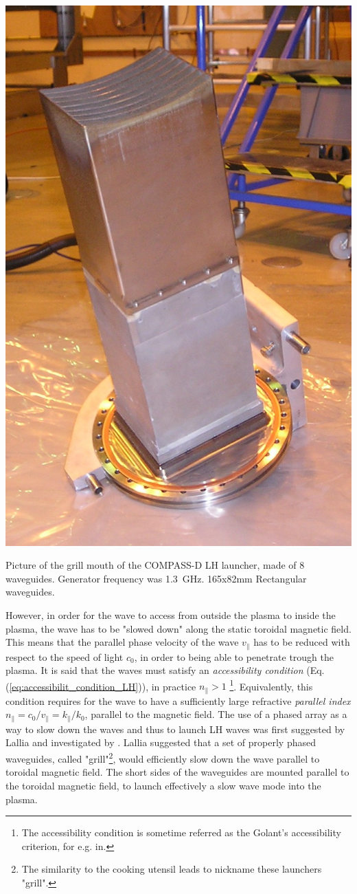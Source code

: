 \begin{marginfigure}
	\centering
	\includegraphics[width=0.8\linewidth]{figures/chap3/COMPASS_grill_out}
	\caption{Picture of the grill mouth of the COMPASS-D LH launcher, made of 8 waveguides. Generator frequency was 1.3~GHz. 165x82mm Rectangular waveguides.}
	\label{fig:compassgrillout}
\end{marginfigure}

However, in order for the wave to access from outside the plasma to inside the plasma, the wave has to be "slowed down" along the static toroidal magnetic field. This means that the parallel phase velocity of the wave $v_{\parallel}$ has to be reduced with respect to the speed of light $c_0$, in order to being able to penetrate trough the plasma. It is said that the waves must satisfy an \emph{accessibility condition} (Eq.(\ref{eq:accessibilit_condition_LH})), in practice $n_\parallel > 1$ \footnote{The accessibility condition is sometime referred as the Golant's accessibility criterion, for e.g. in.}. Equivalently, this condition requires for the wave to have a sufficiently large refractive \emph{parallel index} $n_{\parallel} = c_0/v_{\parallel} = k_{\parallel}/k_0$, parallel to the magnetic field. The use of a phased array as a way to slow down the waves and thus to launch LH waves was first suggested by Lallia and investigated by . Lallia suggested that a set of properly phased waveguides, called "grill"\footnote{The similarity to the cooking utensil leads to nickname these launchers "grill".}, would efficiently slow down the wave parallel to toroidal magnetic field. The short sides of the waveguides are mounted parallel to the toroidal magnetic field, to launch effectively a slow wave mode into the plasma. 

